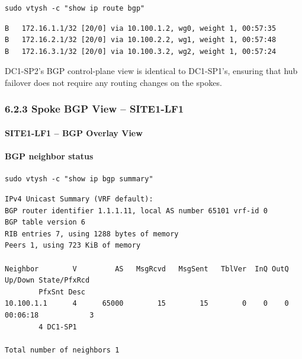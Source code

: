 \documentclass[11pt]{article}
\begin{document}
\begin{verbatim}
sudo vtysh -c "show ip route bgp"
\end{verbatim}

\begin{verbatim}
B   172.16.1.1/32 [20/0] via 10.100.1.2, wg0, weight 1, 00:57:35
B   172.16.2.1/32 [20/0] via 10.100.2.2, wg1, weight 1, 00:57:48
B   172.16.3.1/32 [20/0] via 10.100.3.2, wg2, weight 1, 00:57:24
\end{verbatim}

DC1-SP2’s BGP control-plane view is identical to DC1-SP1’s, ensuring that hub failover does not require any routing changes on the spokes.

%
%
%
\subsubsection{6.2.3 Spoke BGP View -- SITE1-LF1}
\label{sec:bgp-overlay-spoke-site1}

\paragraph{SITE1-LF1 -- BGP Overlay View}

\paragraph{BGP neighbor status}

\begin{verbatim}
sudo vtysh -c "show ip bgp summary"
\end{verbatim}

\begin{verbatim}
IPv4 Unicast Summary (VRF default):
BGP router identifier 1.1.1.11, local AS number 65101 vrf-id 0
BGP table version 6
RIB entries 7, using 1288 bytes of memory
Peers 1, using 723 KiB of memory

Neighbor        V         AS   MsgRcvd   MsgSent   TblVer  InQ OutQ  Up/Down State/PfxRcd
        PfxSnt Desc
10.100.1.1      4      65000        15        15        0    0    0 00:06:18            3
        4 DC1-SP1

Total number of neighbors 1
\end{verbatim}
\end{document}
